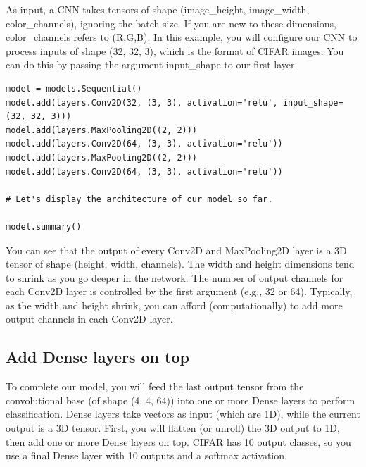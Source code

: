 \documentclass[%
oneside,                 %
final,                   %
10pt]{article}
\begin{document}
As input, a CNN takes tensors of shape (image_height, image_width, color_channels), ignoring the batch size. If you are new to these dimensions, color_channels refers to (R,G,B). In this example, you will configure our CNN to process inputs of shape (32, 32, 3), which is the format of CIFAR images. You can do this by passing the argument input_shape to our first layer.












\begin{verbatim}
model = models.Sequential()
model.add(layers.Conv2D(32, (3, 3), activation='relu', input_shape=(32, 32, 3)))
model.add(layers.MaxPooling2D((2, 2)))
model.add(layers.Conv2D(64, (3, 3), activation='relu'))
model.add(layers.MaxPooling2D((2, 2)))
model.add(layers.Conv2D(64, (3, 3), activation='relu'))

# Let's display the architecture of our model so far.

model.summary()

\end{verbatim}


You can see that the output of every Conv2D and MaxPooling2D layer is a 3D tensor of shape (height, width, channels). The width and height dimensions tend to shrink as you go deeper in the network. The number of output channels for each Conv2D layer is controlled by the first argument (e.g., 32 or 64). Typically, as the width and height shrink, you can afford (computationally) to add more output channels in each Conv2D layer.

\subsection{Add Dense layers on top}

To complete our model, you will feed the last output tensor from the
convolutional base (of shape (4, 4, 64)) into one or more Dense layers
to perform classification. Dense layers take vectors as input (which
are 1D), while the current output is a 3D tensor. First, you will
flatten (or unroll) the 3D output to 1D, then add one or more Dense
layers on top. CIFAR has 10 output classes, so you use a final Dense
layer with 10 outputs and a softmax activation.
\end{document}
